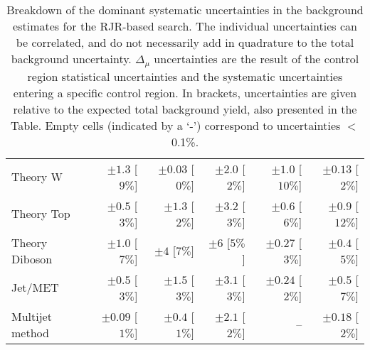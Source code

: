 \begin{table}[hbtp]
\begin{center}
\begin{tabular}{|lrrrrr|}
Theory W                          & $\pm 1.3$ [$9\%$]   & $\pm 0.03$ [$0\%$] & $\pm 2.0$ [$2\%$]  & $\pm 1.0$ [$10\%$]  & $\pm 0.13$ [$2\%$]  \\
Theory Top                        & $\pm 0.5$ [$3\%$]   & $\pm 1.3$ [$2\%$]  & $\pm 3.2$ [$3\%$]  & $\pm 0.6$ [$6\%$]   & $\pm 0.9$ [$12\%$]  \\
Theory Diboson                    & $\pm 1.0$ [$7\%$]   & $\pm 4$ [$7\%$]    & $\pm 6$ [$5\%$]    & $\pm 0.27$ [$3\%$]  & $\pm 0.4$ [$5\%$]   \\
Jet/MET                           & $\pm 0.5$ [$3\%$]   & $\pm 1.5$ [$3\%$]  & $\pm 3.1$ [$3\%$]  & $\pm 0.24$ [$2\%$]  & $\pm 0.5$ [$7\%$]   \\
Multijet method                   & $\pm 0.09$ [$1\%$]  & $\pm 0.4$ [$1\%$]  & $\pm 2.1$ [$2\%$]  & --                  & $\pm 0.18$ [$2\%$]  \\
\hline
\end{tabular}

\end{center}
\caption[Breakdown of uncertainty on background estimates]{
Breakdown of the dominant systematic uncertainties in the background estimates for the RJR-based search.
The individual uncertainties can be correlated, and do not necessarily add in quadrature to
the total background uncertainty. $\Delta_{\mu}$ uncertainties are the result of the control region statistical uncertainties and the systematic uncertainties entering a specific control region. In brackets, uncertainties are given relative to the expected total background yield, also presented in the Table. Empty cells (indicated by a `-') correspond to uncertainties $<$0.1\%. \label{tab:BreakdownSysSRCompressed_RJR}}
\end{table}
